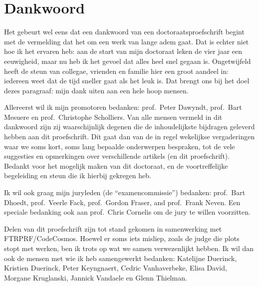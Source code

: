 \documentclass[main]{subfiles}
\begin{document}

\chapter{Dankwoord}\label{ch:dankwoord}

Het gebeurt wel eens dat een dankwoord van een doctoraatsproefschrift begint met de vermelding dat het om een werk van lange adem gaat.
Dat is echter niet hoe ik het ervaren heb: aan de start van mijn doctoraat leken de vier jaar een eeuwigheid, maar nu heb ik het gevoel dat alles heel snel gegaan is.
Ongetwijfeld heeft de steun van collegae, vrienden en familie hier een groot aandeel in: iedereen weet dat de tijd sneller gaat als het leuk is.
Dat brengt ons bij het doel dezes paragraaf: mijn dank uiten aan een hele hoop mensen.

Allereerst wil ik mijn promotoren bedanken: prof.\ Peter Dawyndt, prof.\ Bart Mesuere en prof.\ Christophe Scholliers.
Van alle mensen vermeld in dit dankwoord zijn zij waarschijnlijk degenen die de inhoudelijkste bijdragen geleverd hebben aan dit proefschrift.
Dit gaat dan van de in regel wekelijkse vergaderingen waar we soms kort, soms lang bepaalde onderwerpen bespraken, tot de vele suggesties en opmerkingen over verschillende artikels (en dit proefschrift).
Bedankt voor het mogelijk maken van dit doctoraat, en de voortreffelijke begeleiding en steun die ik hierbij gekregen heb.

Ik wil ook graag mijn juryleden (de ``examencommissie'') bedanken: prof.\ Bart Dhoedt, prof.\ Veerle Fack, prof.\ Gordon Fraser, and prof.\ Frank Neven.
Een speciale bedanking ook aan prof.\ Chris Cornelis om de jury te willen voorzitten.

Delen van dit proefschrift zijn tot stand gekomen in samenwerking met FTRPRF/CodeCosmos.
Hoewel er soms iets misliep, zoals de judge die plots stopt met werken, ben ik trots op wat we samen verwezenlijkt hebben.
Ik wil dan ook de mensen met wie ik heb samengewerkt bedanken: Katelijne Duerinck, Kristien Duerinck, Peter Keyngnaert, Cedric Vanhaverbeke, Elisa David, Morgane Kruglanski, Jannick Vandaele en Glenn Thielman.
\end{document}
